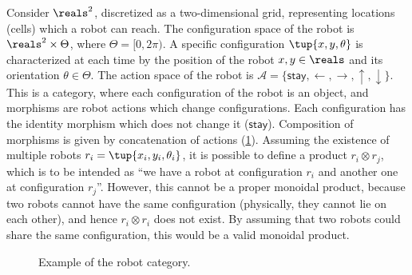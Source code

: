 \begin{example}
    \label{ex:robot}
    Consider $\reals^2$, discretized as a two-dimensional grid, representing locations (cells) which a robot can reach. The configuration space of the robot is $\reals^2\times \Theta$, where $\Theta=[0,2\pi)$. A specific configuration $\tup{x,y,\theta}$ is characterized at each time by the position of the robot $x,y\in \reals$ and its orientation $\theta \in \Theta$. The action space of the robot is $\mathcal{A}=\{\mathsf{stay},\leftarrow, \rightarrow, \uparrow, \downarrow\}$. This is a category, where each configuration of the robot is an object, and morphisms are robot actions which change configurations. Each configuration has the identity morphism which does not change it ($\mathsf{stay}$). Composition of morphisms is given by concatenation of actions (\cref{fig:robotcategory}). Assuming the existence of multiple robots $r_i=\tup{x_i,y_i,\theta_i}$, it is possible to define a product $r_i\otimes r_j$, which is to be intended as ``we have a robot at configuration $r_i$ and another one at configuration $r_j$''. However, this cannot be a proper monoidal product, because two robots cannot have the same configuration (physically, they cannot lie on each other), and hence $r_i\otimes r_i$ does not exist. By assuming that two robots could share the same configuration, this would be a valid monoidal product.
    \begin{figure}[tbh]
        \begin{center}
        \end{center}
        \caption{Example of the robot category. \label{fig:robotcategory}}
    \end{figure}
\end{example}


